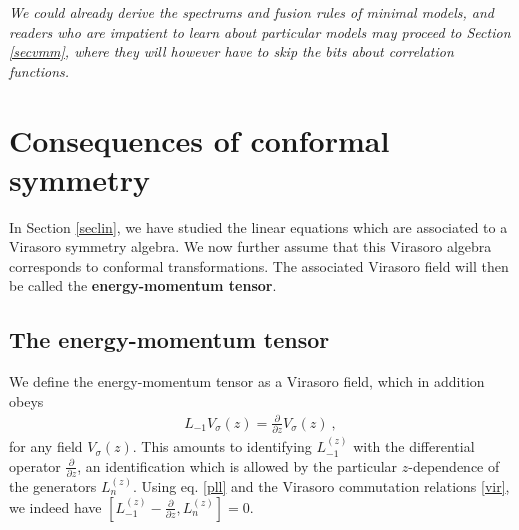 \documentclass[12pt,a4paper,notitlepage]{report}
\numberwithin{equation}{section}
\theoremstyle{break}
\begin{document}
\vspace{2mm} 
 
\textit{We could already derive the spectrums and fusion rules of minimal models, and readers who are impatient to learn about particular models may proceed to Section \ref{secvmm}, where they will however have to skip the bits about correlation functions.} 


\section{Consequences of conformal symmetry \label{secem}}

In Section \ref{seclin}, we have studied the linear equations which are associated to a Virasoro symmetry algebra.
We now further assume that this Virasoro algebra corresponds to conformal transformations.
The associated 
Virasoro field will then be called the \textbf{\boldmath energy-momentum tensor}. 

\subsection{The energy-momentum tensor}

We define the energy-momentum tensor as a Virasoro field, which in addition obeys
\begin{align}
 \boxed{L_{-1} V_\sigma (z) = {\frac{\partial}{\partial z}} V_\sigma(z)} \ ,
\label{lvpv}
\end{align}
for any field $V_\sigma(z)$.
This amounts to identifying $L_{-1}^{(z)}$ with the differential operator ${\frac{\partial}{\partial z}}$, an identification which is allowed by the particular $z$-dependence of the generators $L_n^{(z)}$.
Using eq. \eqref{pll} and the Virasoro commutation relations \eqref{vir}, we indeed have $[L_{-1}^{(z)}-{\frac{\partial}{\partial z}},L_n^{(z)}]=0$. 
\end{document}
